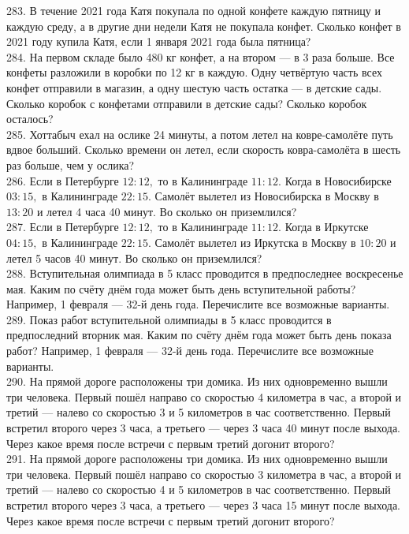 283. В течение 2021 года Катя покупала по одной конфете каждую пятницу и каждую среду, а в другие дни недели Катя не покупала конфет. Сколько конфет в 2021 году купила Катя, если 1 января 2021 года была пятница?\\
284. На первом складе было 480 кг конфет, а на втором --- в 3 раза больше. Все конфеты разложили в коробки по 12 кг в каждую. Одну четвёртую часть всех конфет отправили в магазин, а одну шестую часть остатка --- в детские сады. Сколько коробок с конфетами отправили в детские сады? Сколько коробок осталось?\\
285. Хоттабыч ехал на ослике 24 минуты, а потом летел на ковре-самолёте путь вдвое больший. Сколько времени он летел, если скорость ковра-самолёта в шесть раз больше, чем у ослика?\\
286. Если в Петербурге $12:12,$ то в Калининграде $11:12.$ Когда в Новосибирске $03:15,$ в Калининграде $22:15.$ Самолёт вылетел из Новосибирска в Москву в $13:20$ и летел 4 часа 40 минут. Во сколько он приземлился?\\
287. Если в Петербурге $12:12,$ то в Калининграде $11:12.$ Когда в Иркутске $04:15,$ в Калининграде $22:15.$ Самолёт вылетел из Иркутска в Москву в $10:20$ и летел 5 часов 40 минут. Во сколько он приземлился?\\
288. Вступительная олимпиада в 5 класс проводится в предпоследнее воскресенье мая. Каким по счёту днём года может быть день вступительной работы? Например, 1 февраля --- 32-й день года. Перечислите все возможные варианты.\\
289. Показ работ вступительной олимпиады в 5 класс проводится в предпоследний вторник мая. Каким по счёту днём года может быть день показа работ? Например, 1 февраля --- 32-й день года. Перечислите все возможные варианты.\\
290. На прямой дороге расположены три домика. Из них одновременно вышли три человека. Первый пошёл направо со скоростью 4 километра в час, а второй и третий --- налево со скоростью 3 и 5 километров в час соответственно. Первый встретил второго через 3 часа, а третьего --- через 3 часа 40 минут после выхода. Через какое время после встречи с первым третий догонит второго?\\
291. На прямой дороге расположены три домика. Из них одновременно вышли три человека. Первый пошёл направо со скоростью 3 километра в час, а второй и третий --- налево со скоростью 4 и 5 километров в час соответственно. Первый встретил второго через 3 часа, а третьего --- через 3 часа 15 минут после выхода. Через какое время после встречи с первым третий догонит второго?\\
